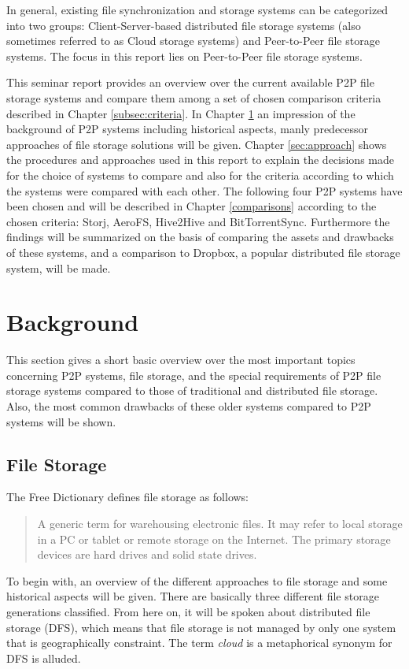 In general, existing file synchronization and storage systems can be categorized into two groups: Client-Server-based distributed file storage systems (also sometimes referred to as Cloud storage systems) and Peer-to-Peer file storage systems. The focus in this report lies on Peer-to-Peer file storage systems.

This seminar report provides an overview over the current available P2P file storage systems and compare them among a set of chosen comparison criteria described in Chapter \ref{subsec:criteria}. In Chapter \ref{sec:background} an impression of the background of P2P systems including historical aspects, manly predecessor approaches of file storage solutions will be given. Chapter \ref{sec:approach} shows the procedures and approaches used in this report to explain the decisions made for the choice of systems to compare and also for the criteria according to which the systems were compared with each other. The following four P2P systems have been chosen and will be described in Chapter \ref{comparisons} according to the chosen criteria: Storj, AeroFS, Hive2Hive and BitTorrentSync. Furthermore the findings will be summarized on the basis of comparing the assets and drawbacks of these systems, and a comparison to Dropbox, a popular distributed file storage system, will be made.

\section{Background}
\label{sec:background}
This section gives a short basic overview over the most important topics concerning P2P systems, file storage, and the special requirements of P2P file storage systems compared to those of traditional and distributed file storage. Also, the most common drawbacks of these older systems compared to P2P systems will be shown.

\subsection{File Storage}
The Free Dictionary defines file storage as follows:
\begin{quote}
A generic term for warehousing electronic files. It may refer to local storage in a PC or tablet or remote storage on the Internet. The primary storage devices are hard drives and solid state drives. \cite{thefreedictionary}
\end{quote}
To begin with, an overview of the different approaches to file storage and some historical aspects will be given. There are basically three different file storage generations classified. From here on, it will be spoken about distributed file storage (DFS), which means that file storage is not managed by only one system that is geographically constraint. The term \textit{cloud} is a metaphorical synonym for DFS is alluded.

